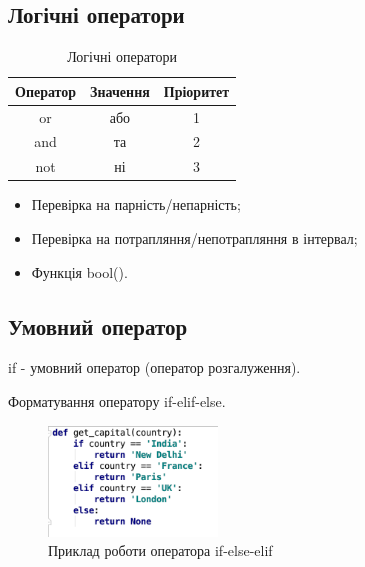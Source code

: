  \subsection{Логічні оператори} 
\begin{frame}
\begin{table}
  \caption{Логічні оператори}
  \label{tab:}

  \begin{center}
    \begin{tabular}{|c|c|c|}
    \hline
      \textbf{Оператор} & \textbf{Значення} & \textbf{Пріоритет} \\
    \hline  
      or & або & 1 \\
    \hline
      and & та & 2 \\
    \hline
      not & ні & 3 \\
    \hline
    \end{tabular}
  \end{center}
\end{table}
\end{frame}

\begin{frame}
\begin{itemize}
  \item Перевірка на парність/непарність;
  \item Перевірка на потрапляння/непотрапляння в інтервал;
  \item Функція bool().
 \end{itemize}
\end{frame}

 \subsection{Умовний оператор} 
\begin{frame}
if - умовний оператор (оператор розгалуження).

Форматування оператору if-elif-else.
\begin{figure}
\begin{center}
 \includegraphics[width=0.4\textwidth]{pictures/python-if-else-elif-example.png}
\caption{Приклад роботи оператора if-else-elif}
\label{if-else-elif} 
\end{center}
\end{figure}
\end{frame}

